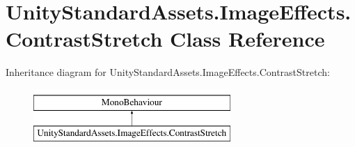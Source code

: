 \hypertarget{class_unity_standard_assets_1_1_image_effects_1_1_contrast_stretch}{}\section{Unity\+Standard\+Assets.\+Image\+Effects.\+Contrast\+Stretch Class Reference}
\label{class_unity_standard_assets_1_1_image_effects_1_1_contrast_stretch}
Inheritance diagram for Unity\+Standard\+Assets.\+Image\+Effects.\+Contrast\+Stretch\+:\begin{figure}[H]
\begin{center}
\leavevmode
\includegraphics[height=2.000000cm]{class_unity_standard_assets_1_1_image_effects_1_1_contrast_stretch}
\end{center}
\end{figure}
